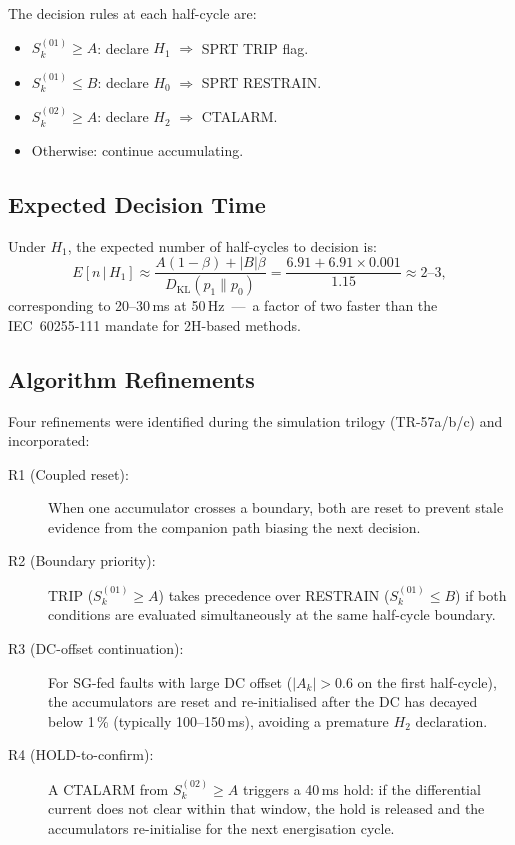 \documentclass[journal,twoside,10pt]{IEEEtran}
\newcommand{\Ak}{A_k}
\newcommand{\DKL}{D_{\mathrm{KL}}}
\begin{document}
The decision rules at each half-cycle are:
\begin{itemize}
  \item $S^{(01)}_k \geq A$: declare $H_1$ $\Rightarrow$ SPRT TRIP flag.
  \item $S^{(01)}_k \leq B$: declare $H_0$ $\Rightarrow$ SPRT RESTRAIN.
  \item $S^{(02)}_k \geq A$: declare $H_2$ $\Rightarrow$ CTALARM.
  \item Otherwise: continue accumulating.
\end{itemize}

\subsection{Expected Decision Time}

Under $H_1$, the expected number of half-cycles to decision is:
\begin{equation}
  E[n\,|\,H_1] \approx
  \frac{A(1-\beta) + |B|\beta}{\DKL(p_1 \| p_0)}
  = \frac{6.91 + 6.91{\times}0.001}{1.15}
  \approx 2\text{--}3,
  \label{eq:En}
\end{equation}
corresponding to 20--30\,ms at 50\,Hz~---~a factor of two faster than the
IEC~60255-111 mandate for 2H-based methods.

\subsection{Algorithm Refinements}
\label{sec:refinements}

Four refinements were identified during the simulation trilogy
(TR-57a/b/c) and incorporated:
\begin{description}
  \item[R1 (Coupled reset):] When one accumulator crosses a boundary,
        both are reset to prevent stale evidence from the companion path
        biasing the next decision.
  \item[R2 (Boundary priority):] TRIP ($S^{(01)}_k \geq A$) takes
        precedence over RESTRAIN ($S^{(01)}_k \leq B$) if both conditions
        are evaluated simultaneously at the same half-cycle boundary.
  \item[R3 (DC-offset continuation):] For SG-fed faults with large DC
        offset ($|\Ak| > 0.6$ on the first half-cycle), the accumulators
        are reset and re-initialised after the DC has decayed below 1\,\%
        (typically 100--150\,ms), avoiding a premature $H_2$ declaration.
  \item[R4 (HOLD-to-confirm):] A CTALARM from $S^{(02)}_k \geq A$
        triggers a 40\,ms hold: if the differential current does not clear
        within that window, the hold is released and the accumulators
        re-initialise for the next energisation cycle.
\end{description}
\end{document}
